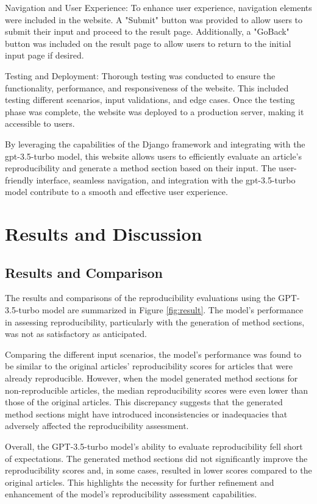 \documentclass[12pt, a4paper, twocolumn]{article}
\begin{document}
Navigation and User Experience: To enhance user experience, navigation elements were included in the website. A "Submit" button was provided to allow users to submit their input and proceed to the result page. Additionally, a "GoBack" button was included on the result page to allow users to return to the initial input page if desired.

Testing and Deployment: Thorough testing was conducted to ensure the functionality, performance, and responsiveness of the website. This included testing different scenarios, input validations, and edge cases. Once the testing phase was complete, the website was deployed to a production server, making it accessible to users.

By leveraging the capabilities of the Django framework and integrating with the gpt-3.5-turbo model, this website allows users to efficiently evaluate an article's reproducibility and generate a method section based on their input. The user-friendly interface, seamless navigation, and integration with the gpt-3.5-turbo model contribute to a smooth and effective user experience.

	\section{Results and Discussion}
		\subsection{Results and Comparison}
		The results and comparisons of the reproducibility evaluations using the GPT-3.5-turbo model are summarized in Figure \ref{fig:result}. The model's performance in assessing reproducibility, particularly with the generation of method sections, was not as satisfactory as anticipated.

		Comparing the different input scenarios, the model's performance was found to be similar to the original articles' reproducibility scores for articles that were already reproducible. However, when the model generated method sections for non-reproducible articles, the median reproducibility scores were even lower than those of the original articles. This discrepancy suggests that the generated method sections might have introduced inconsistencies or inadequacies that adversely affected the reproducibility assessment.
		
		Overall, the GPT-3.5-turbo model's ability to evaluate reproducibility fell short of expectations. The generated method sections did not significantly improve the reproducibility scores and, in some cases, resulted in lower scores compared to the original articles. This highlights the necessity for further refinement and enhancement of the model's reproducibility assessment capabilities.
		
\end{document}
